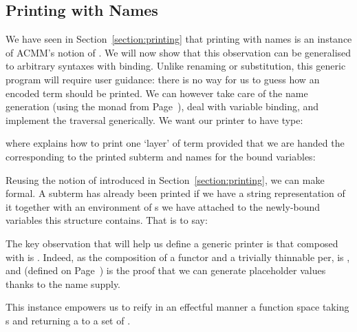 
\subsection{Printing with Names}\label{section:genericprinting}

We have seen in Section~\ref{section:printing} that printing with names
is an instance of ACMM's notion of \semrec{}. We will now show that this
observation can be generalised to arbitrary syntaxes with binding. Unlike
renaming or substitution, this generic program will require user guidance:
there is no way for us to guess how an encoded term should be printed. We
can however take care of the name generation (using the  monad from Page~\pageref{section:printing}), deal with variable binding,
and implement the traversal generically. We want our printer to have type:
\begin{agdasnippet}
\end{agdasnippet}
%
where  explains how to print one `layer' of term provided that
we are handed the  corresponding to the printed subterm and
names for the bound variables:
\begin{agdasnippet}
\end{agdasnippet}
%
Reusing the notion of  introduced in Section~\ref{section:printing},
we can make  formal. A subterm has already been printed if we
have a string representation of it together with an environment of s
we have attached to the newly-bound variables this structure contains.
That is to say:
%
\begin{agdasnippet}
\end{agdasnippet}
%
The key observation that will help us define a generic printer is that
 composed with  is . Indeed, as the composition
of a functor and a trivially thinnable per,  is ,
and  (defined on Page~\pageref{section:printing}) is the proof that we
can generate placeholder values thanks to the name supply.

\begin{agdasnippet}
\end{agdasnippet}

This  instance empowers us to reify in an effectful manner
a  function space taking s and returning a 
to a set of .

